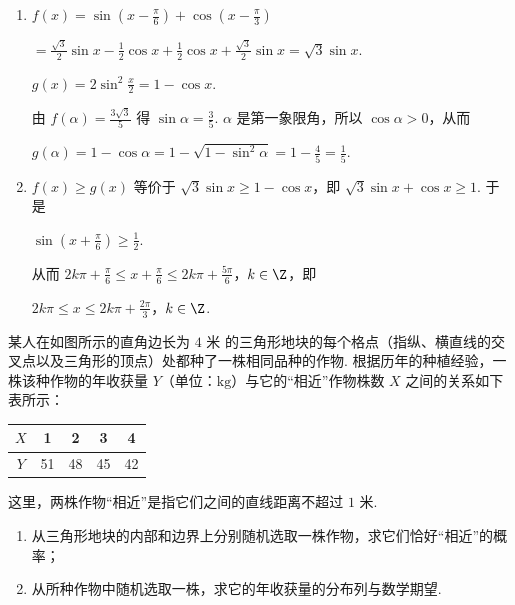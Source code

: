 \begin{solution}
\begin{enumerate}
\item \(f(x)=\sin\left(x-\frac{\pi}{6}\right)+\cos\left(x-\frac{\pi}{3}\right)\)

\(=\frac{\sqrt{3}}{2}\sin x-\frac{1}{2}\cos x+\frac{1}{2}\cos x+\frac{\sqrt{3}}{2}\sin x=\sqrt{3}\sin x\).

\(g(x)=2\sin^{2}\frac{x}{2}=1-\cos x\).

由 \(f(\alpha)=\frac{3\sqrt{3}}{5}\) 得 \(\sin\alpha=\frac{3}{5}\). \(\alpha\) 是第一象限角，所以 \(\cos\alpha>0\)，从而

\(g(\alpha)=1-\cos\alpha=1-\sqrt{1-\sin^{2}\alpha}=1-\frac{4}{5}=\frac{1}{5}\).

\item \(f(x)\geqslant g(x)\) 等价于 \(\sqrt{3}\sin x\geqslant 1-\cos x\)，即 \(\sqrt{3}\sin x+\cos x\geqslant 1\). 于是

\(\sin\left(x+\frac{\pi}{6}\right)\geqslant\frac{1}{2}\).

从而 \(2k\pi+\frac{\pi}{6}\leqslant x+\frac{\pi}{6}\leqslant 2k\pi+\frac{5\pi}{6}\)，\(k\in\Z\)，即

\(2k\pi\leqslant x\leqslant 2k\pi+\frac{2\pi}{3}\)，\(k\in\Z\).
\end{enumerate}
\end{solution}

\begin{problem}
某人在如图所示的直角边长为 \(4\text{ 米}\) 的三角形地块的每个格点（指纵、横直线的交叉点以及三角形的顶点）处都种了一株相同品种的作物. 根据历年的种植经验，一株该种作物的年收获量 \(Y\)（单位：\(\mathrm{kg}\)）与它的“相近”作物株数 \(X\) 之间的关系如下表所示：

\begin{center}
\begin{tabular}{c|cccc}
\(X\) & 1 & 2 & 3 & 4 \\
\hline
\(Y\) & 51 & 48 & 45 & 42
\end{tabular}
\end{center}

这里，两株作物“相近”是指它们之间的直线距离不超过 \(1\text{ 米}\).

\begin{enumerate}
\item 从三角形地块的内部和边界上分别随机选取一株作物，求它们恰好“相近”的概率；
\item 从所种作物中随机选取一株，求它的年收获量的分布列与数学期望.
\end{enumerate}

\begingroup
\leftskip=0pt\relax
\rightskip=0pt\relax
{}
\endgroup
\end{problem}


